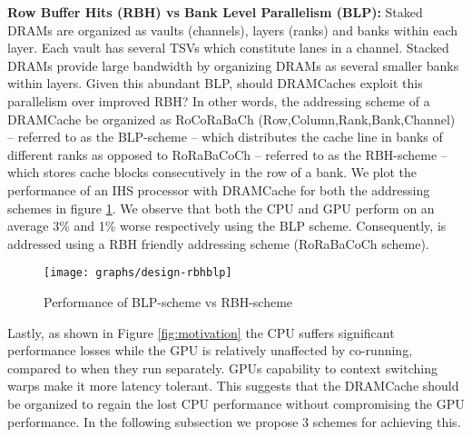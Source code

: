 \par \textbf{Row Buffer Hits (RBH) vs Bank Level Parallelism (BLP):} Staked DRAMs are organized as vaults (channels), layers (ranks) and banks within each layer. Each vault has several TSVs which constitute lanes in a channel. Stacked DRAMs provide large bandwidth by organizing DRAMs as several smaller banks within layers. Given this abundant BLP, should DRAMCaches exploit this parallelism over improved RBH? In other words, the addressing scheme of a DRAMCache be organized as RoCoRaBaCh (Row,Column,Rank,Bank,Channel) -- referred to as the BLP-scheme -- which distributes the cache line in banks of different ranks as opposed to RoRaBaCoCh -- referred to as the RBH-scheme -- which stores cache blocks consecutively in the row of a bank. We plot the performance of an IHS processor with DRAMCache for both the addressing schemes in figure \ref{fig:design-rbhblp}. We observe that both the CPU and GPU perform on an average 3\% and 1\% worse respectively using the BLP scheme. Consequently, \cachename is addressed using a RBH friendly addressing scheme (RoRaBaCoCh scheme). 

\begin{figure}[htbp]
   \texttt{[image: graphs/design-rbhblp]}
   \caption{Performance of BLP-scheme vs RBH-scheme}
   \label{fig:design-rbhblp}
\end{figure}

\par Lastly, as shown in Figure \ref{fig:motivation} the CPU suffers significant performance losses while the GPU is relatively unaffected by co-running, compared to when they run separately. GPUs capability to context switching warps make it more latency tolerant. This suggests that the DRAMCache should be organized to regain the lost CPU performance without compromising the GPU performance.  In the following subsection we propose 3 schemes for achieving this. 